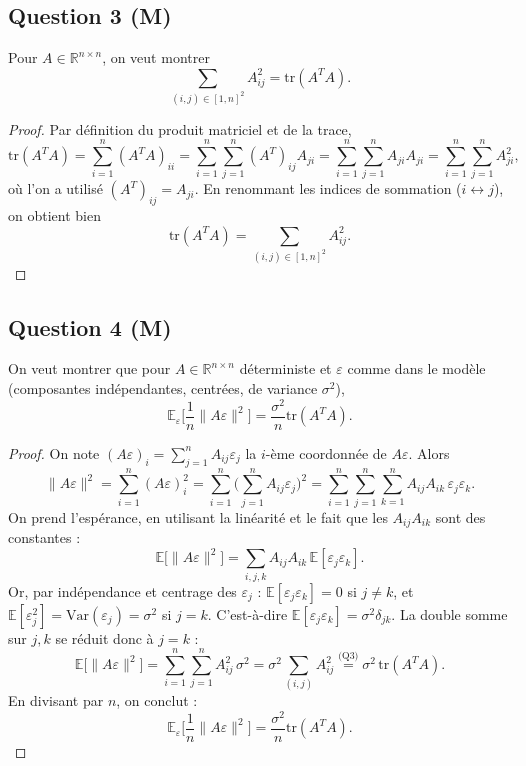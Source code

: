 \documentclass[11pt]{article}
\theoremstyle{remark}
\newcommand{\E}{\mathbb{E}}
\newcommand{\R}{\mathbb{R}}
\newcommand{\Var}{\mathrm{Var}}
\newcommand{\tr}{\mathrm{tr}}
\begin{document}
	\subsection*{Question 3 (M)}
	
	Pour $A \in \R^{n\times n}$, on veut montrer
	\[
	\sum_{(i,j)\in[1,n]^2} A_{ij}^2 = \tr(A^TA).
	\]
	
	\begin{proof}
		Par définition du produit matriciel et de la trace,
		\[
		\tr(A^TA) = \sum_{i=1}^n (A^TA)_{ii} = \sum_{i=1}^n \sum_{j=1}^n (A^T)_{ij}A_{ji} = \sum_{i=1}^n\sum_{j=1}^n A_{ji}A_{ji} = \sum_{i=1}^n\sum_{j=1}^n A_{ji}^2,
		\]
		où l'on a utilisé $(A^T)_{ij} = A_{ji}$. En renommant les indices de sommation ($i\leftrightarrow j$), on obtient bien
		\[
		\tr(A^TA) = \sum_{(i,j)\in[1,n]^2} A_{ij}^2.
		\]
	\end{proof}
	
	\subsection*{Question 4 (M)}
	
	On veut montrer que pour $A \in \R^{n\times n}$ déterministe et $\varepsilon$ comme dans le modèle (composantes indépendantes, centrées, de variance $\sigma^2$),
	\[
	\E_\varepsilon\Big[\frac1n\|A\varepsilon\|^2\Big] = \frac{\sigma^2}{n}\tr(A^TA).
	\]
	
	\begin{proof}
		On note $(A\varepsilon)_i = \sum_{j=1}^n A_{ij}\varepsilon_j$ la $i$-ème coordonnée de $A\varepsilon$. Alors
		\[
		\|A\varepsilon\|^2 = \sum_{i=1}^n (A\varepsilon)_i^2 = \sum_{i=1}^n\Big(\sum_{j=1}^n A_{ij}\varepsilon_j\Big)^2 = \sum_{i=1}^n \sum_{j=1}^n\sum_{k=1}^n A_{ij}A_{ik}\,\varepsilon_j\varepsilon_k.
		\]
		On prend l'espérance, en utilisant la linéarité et le fait que les $A_{ij}A_{ik}$ sont des constantes :
		\[
		\E\big[\|A\varepsilon\|^2\big] = \sum_{i,j,k} A_{ij}A_{ik}\,\E[\varepsilon_j\varepsilon_k].
		\]
		Or, par indépendance et centrage des $\varepsilon_j$ : $\E[\varepsilon_j\varepsilon_k] = 0$ si $j\neq k$, et $\E[\varepsilon_j^2] = \Var(\varepsilon_j) = \sigma^2$ si $j=k$. C'est-à-dire $\E[\varepsilon_j\varepsilon_k] = \sigma^2 \delta_{jk}$. La double somme sur $j,k$ se réduit donc à $j=k$ :
		\[
		\E\big[\|A\varepsilon\|^2\big] = \sum_{i=1}^n\sum_{j=1}^n A_{ij}^2\,\sigma^2 = \sigma^2 \sum_{(i,j)} A_{ij}^2 \overset{\text{(Q3)}}{=} \sigma^2\,\tr(A^TA).
		\]
		En divisant par $n$, on conclut :
		\[
		\E_\varepsilon\Big[\frac1n\|A\varepsilon\|^2\Big] = \frac{\sigma^2}{n}\tr(A^TA).
		\]
	\end{proof}
	
\end{document}
